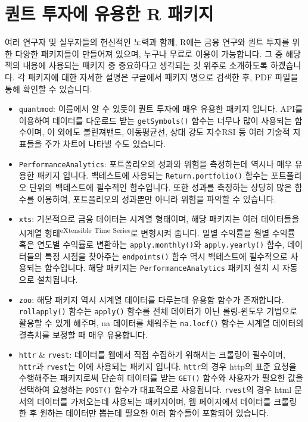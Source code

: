 \documentclass[]{book}
\begin{document}
\hypertarget{r--1}{%
\section{퀀트 투자에 유용한 R 패키지}\label{r--1}}

여러 연구자 및 실무자들의 헌신적인 노력과 함께, R에는 금융 연구와 퀀트 투자를 위한 다양한 패키지들이 만들어져 있으며, 누구나 무료로 이용이 가능합니다. 그 중 해당 책의 내용에 사용되는 패키지 중 중요하다고 생각되는 것 위주로 소개하도록 하겠습니다. 각 패키지에 대한 자세한 설명은 구글에서 패키지 명으로 검색한 후, PDF 파일을 통해 확인할 수 있습니다.

\begin{itemize}
\item
  \texttt{quantmod}: 이름에서 알 수 있듯이 퀀트 투자에 매우 유용한 패키지 입니다. API를 이용하여 데이터를 다운로드 받는 \texttt{getSymbols()} 함수는 너무나 많이 사용되는 함수이며, 이 외에도 볼린져밴드, 이동평균선, 상대 강도 지수RSI 등 여러 기술적 지표들을 주가 차트에 나타낼 수도 있습니다.
\item
  \texttt{PerformanceAnalytics}: 포트폴리오의 성과와 위험을 측정하는데 역시나 매우 유용한 패키지 입니다. 백테스트에 사용되는 \texttt{Return.portfolio()} 함수는 포트폴리오 단위의 백테스트에 필수적인 함수입니다. 또한 성과를 측정하는 상당히 많은 함수를 이용하여, 포트폴리오의 성과뿐만 아니라 위험을 파악할 수 있습니다.
\item
  \texttt{xts}: 기본적으로 금융 데이터는 시계열 형태이며, 해당 패키지는 여러 데이터들을 시계열 형태\textsuperscript{eXtensible} \textsuperscript{Time} \textsuperscript{Series}로 변형시켜 줍니다. 일별 수익률을 월별 수익률 혹은 연도별 수익률로 변환하는 \texttt{apply.monthly()}와 \texttt{apply.yearly()} 함수, 데이터들의 특정 시점을 찾아주는 \texttt{endpoints()} 함수 역시 백테스트에 필수적으로 사용되는 함수입니다. 해당 패키지는 \texttt{PerformanceAnalytics} 패키지 설치 시 자동으로 설치됩니다.
\item
  \texttt{zoo}: 해당 패키지 역시 시계열 데이터를 다루는데 유용함 함수가 존재합니다. \texttt{rollapply()} 함수는 \texttt{apply()} 함수를 전체 데이터가 아닌 롤링-윈도우 기법으로 활용할 수 있게 해주며, na 데이터를 채워주는 \texttt{na.locf()} 함수는 시계열 데이터의 결측치를 보정할 때 매우 유용합니다.
\item
  \texttt{httr} \& \texttt{rvest}: 데이터를 웹에서 직접 수집하기 위해서는 크롤링이 필수이며, \texttt{httr}과 \texttt{rvest}는 이에 사용되는 패키지 입니다. \texttt{httr}의 경우 http의 표준 요청을 수행해주는 패키지로써 단순히 데이터를 받는 \texttt{GET()} 함수와 사용자가 필요한 값을 선택하여 요청하는 \texttt{POST()} 함수가 대표적으로 사용됩니다. \texttt{rvest}의 경우 html 문서의 데이터를 가져오는데 사용되는 패키지이며, 웹 페이지에서 데이터를 크롤링 한 후 원하는 데이터만 뽑는데 필요한 여러 함수들이 포함되어 있습니다.

\end{itemize}
\end{document}
